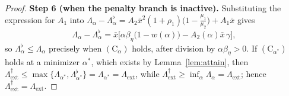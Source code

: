 \documentclass[10pt,a4paper]{amsart}
\newcommand{\Lext}{\Lambda_{\mathrm{ext}}}
\newcommand{\Lsharp}{\Lambda_{\mathrm{ext}}^{\dagger}}
\newcommand{\betaeta}{\beta_\eta}
\begin{document}
\begin{proof}
\textbf{Step 6 (when the penalty branch is inactive).} Substituting the expression for $A_1$ into $\Lambda_\alpha-\Lambda_\alpha^\flat=A_2\bar x^2(1+\rho_1)\big(1-\tfrac{\mu_1}{\mu_2}\big)+A_1\bar x$ gives
\begin{equation}\label{eq:Cgap}
\Lambda_\alpha-\Lambda_\alpha^{\flat}=\bar x\Big[\alpha\betaeta\big(1-\widehat w(\alpha)\big)-A_2(\alpha)\bar x\,\gamma\Big],
\end{equation}
so $\Lambda_\alpha^{\flat}\le\Lambda_\alpha$ precisely when $(\mathrm{C}_\alpha)$ holds, after division by $\alpha\betaeta>0$. If $(\mathrm{C}_{\alpha^\ast})$ holds at a minimizer $\alpha^\ast$, which exists by Lemma~\ref{lem:attain}, then $\Lsharp\le\max\{\Lambda_{\alpha^\ast},\Lambda_{\alpha^\ast}^\flat\}=\Lambda_{\alpha^\ast}=\Lext$, while $\Lsharp\ge\inf_\alpha\Lambda_\alpha=\Lext$; hence $\Lsharp=\Lext$.
\end{proof}
\end{document}

